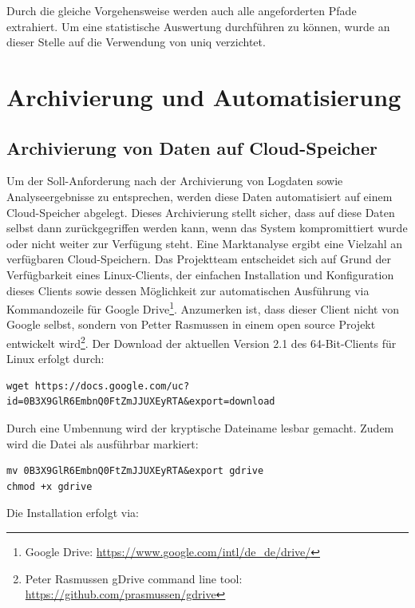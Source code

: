 Durch die gleiche Vorgehensweise werden auch alle angeforderten Pfade extrahiert. Um eine statistische Auswertung durchführen zu können, wurde an dieser Stelle auf die Verwendung von uniq verzichtet.

\section{Archivierung und Automatisierung}
\label{sec:Archivierung und Automatisierung}


\subsection{Archivierung von Daten auf Cloud-Speicher}
\label{subsec:Archivierung von Daten auf Cloud-Speicher}

Um der Soll-Anforderung nach der Archivierung von Logdaten sowie Analyseergebnisse zu entsprechen, werden diese Daten automatisiert auf einem Cloud-Speicher abgelegt. Dieses Archivierung stellt sicher, dass auf diese Daten selbst dann zurückgegriffen werden kann, wenn das System kompromittiert wurde oder nicht weiter zur Verfügung steht. Eine Marktanalyse ergibt eine Vielzahl an verfügbaren Cloud-Speichern. Das Projektteam entscheidet sich auf Grund der Verfügbarkeit eines Linux-Clients, der einfachen Installation und Konfiguration dieses Clients sowie dessen Möglichkeit zur automatischen Ausführung via Kommandozeile für Google Drive\footnote{ Google Drive: \url{https://www.google.com/intl/de_de/drive/}}. Anzumerken ist, dass dieser Client nicht von Google selbst, sondern von Petter Rasmussen in einem open source Projekt entwickelt wird\footnote{ Peter Rasmussen gDrive command line tool: \url{https://github.com/prasmussen/gdrive}}. Der Download der aktuellen Version 2.1 des 64-Bit-Clients für Linux erfolgt durch:

\begin{lstlisting}[style=customc]
wget https://docs.google.com/uc?id=0B3X9GlR6EmbnQ0FtZmJJUXEyRTA&export=download
\end{lstlisting}

Durch eine Umbennung wird der kryptische Dateiname lesbar gemacht. Zudem wird die Datei als ausführbar markiert:

\begin{lstlisting}[style=customc]
mv 0B3X9GlR6EmbnQ0FtZmJJUXEyRTA&export gdrive
chmod +x gdrive
\end{lstlisting}

Die Installation erfolgt via:

